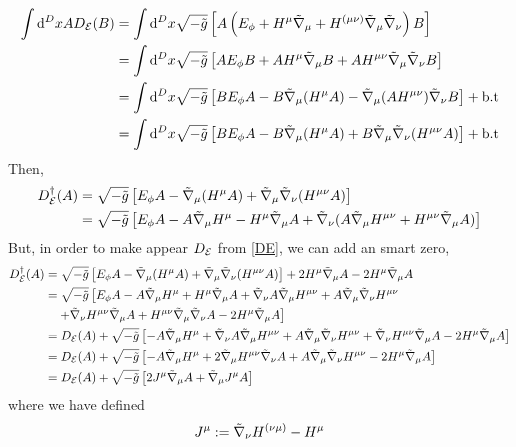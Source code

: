 \begin{align}
  \int\dd^DxAD_{\mathcal{E}} (B)&=\int\dd^Dx\sqrt{-\tilde{g}}\left[A\left(E_\phi +H^\mu\tilde{\nabla}_\mu +H^{(\mu\nu )}\tilde{\nabla}_\mu\tilde{\nabla}_\nu\right)B\right]\\
  &=\int\dd^Dx\sqrt{-\tilde{g}}\left[AE_\phi B +AH^\mu \tilde{\nabla}_\mu B+AH^{\mu\nu }\tilde{\nabla}_\mu\tilde{\nabla}_\nu B\right]\\
  &=\int\dd^Dx\sqrt{-\tilde{g}}\left[BE_\phi A-B\tilde{\nabla}_\mu (H^\mu A)-\tilde{\nabla}_\mu (AH^{\mu\nu })\tilde{\nabla}_\nu B\right]+\rm b.t\\
  &=\int\dd^Dx\sqrt{-\tilde{g}}\left[BE_\phi A-B\tilde{\nabla}_\mu (H^\mu A)+B\tilde{\nabla}_\mu\tilde{\nabla}_\nu (H^{\mu\nu }A)\right]+\rm b.t
\end{align}
Then, 
\begin{align}
  D^\dagger_{\mathcal{E}} (A)&=\sqrt{-\tilde{g}}\left[E_\phi A-\tilde{\nabla}_\mu (H^\mu A)+\tilde{\nabla}_\mu\tilde{\nabla}_\nu (H^{\mu\nu }A)\right]\\
  &=\sqrt{-\tilde{g}}\left[E_\phi A-A\tilde{\nabla}_\mu H^\mu -H^\mu \tilde{\nabla}_\mu A+\tilde{\nabla}_\nu (A\tilde{\nabla}_\mu H^{\mu\nu }+H^{\mu\nu }\tilde{\nabla}_\mu A)\right]
\end{align}
But, in order to make appear $D_{\mathcal{E}}$ from \eqref{DE}, we can add an smart zero,
\begin{align}
  D^\dagger_{\mathcal{E}} (A)&=\sqrt{-\tilde{g}}\left[E_\phi A-\tilde{\nabla}_\mu (H^\mu A)+\tilde{\nabla}_\mu\tilde{\nabla}_\nu (H^{\mu\nu }A)\right]+2H^\mu \tilde{\nabla}_\mu A-2H^\mu \tilde{\nabla}_\mu A\\
  &=\sqrt{-\tilde{g}}\left[E_\phi A-A\tilde{\nabla}_\mu H^\mu +H^\mu \tilde{\nabla}_\mu A+\tilde{\nabla}_\nu A\tilde{\nabla}_\mu H^{\mu\nu }+A\tilde{\nabla}_\mu \tilde{\nabla}_\nu H^{\mu\nu }\right. \\
  &\left.\quad +\tilde{\nabla}_\nu H^{\mu\nu }\tilde{\nabla}_\mu A +H^{\mu\nu }\tilde{\nabla}_\mu \tilde{\nabla}_\nu A -2H^\mu \tilde{\nabla}_\mu A\right]\\
  &=D_{\mathcal{E}} (A)+\sqrt{-\tilde{g}}\left[-A\tilde{\nabla}_\mu H^\mu +\tilde{\nabla}_\nu A\tilde{\nabla}_\mu H^{\mu\nu }+A\tilde{\nabla}_\mu \tilde{\nabla}_\nu H^{\mu\nu }+\tilde{\nabla}_\nu H^{\mu\nu }\tilde{\nabla}_\mu A-2H^\mu \tilde{\nabla}_\mu A\right]\\
  &=D_{\mathcal{E}} (A)+\sqrt{-\tilde{g}}\left[-A\tilde{\nabla}_\mu H^\mu +2\tilde{\nabla}_\mu H^{\mu\nu }\tilde{\nabla}_\nu A+A\tilde{\nabla}_\mu \tilde{\nabla}_\nu H^{\mu\nu }-2H^\mu \tilde{\nabla}_\mu A\right]\\
  &=D_{\mathcal{E}} (A)+\sqrt{-\tilde{g}}\left[2J^\mu \tilde{\nabla}_\mu A+\tilde{\nabla}_\mu J^\mu A\right]
\end{align}
where we have defined
\begin{equation}
  J^\mu :=\tilde{\nabla}_\nu H^{(\nu\mu) }-H^\mu 
\end{equation}

